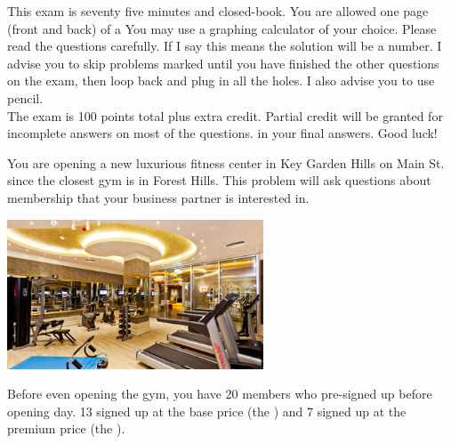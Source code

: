 \documentclass[12pt]{article}
\begin{document}
This exam is seventy five minutes and closed-book. You are allowed one page (front and back) of a  You may use a graphing calculator of your choice. Please read the questions carefully. If I say  this means the solution will be a number. I advise you to skip problems marked  until you have finished the other questions on the exam, then loop back and plug in all the holes. I also advise you to use pencil.\\

\noindent The exam is 100 points total plus extra credit. Partial credit will be granted for incomplete answers on most of the questions.  in your final answers. Good luck!

\pagebreak

%

\problem You are opening a new luxurious fitness center in Key Garden Hills on Main St. since the closest gym is in Forest Hills. This problem will ask questions about membership that your business partner is interested in.

\begin{center}
\includegraphics[width=3in]{gym.png}
\end{center}

\noindent Before even opening the gym, you have 20 members who pre-signed up before opening day. 13 signed up at the base price (the ) and 7 signed up at the premium price (the ).
\end{document}
